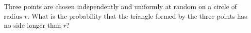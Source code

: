 Three points are chosen independently and uniformly at random on a circle of radius $r$. What is the probability that the triangle formed by the three points has no side longer than $r$?
